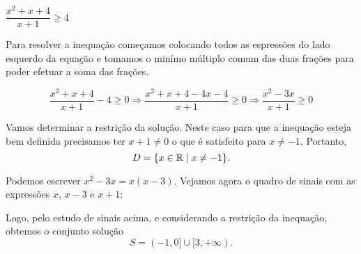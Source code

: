 \begin{exem}
  $\dfrac{x^2+x+4}{x+1} \geq 4$

  Para resolver a inequação começamos colocando todos as espressões do lado esquerdo da equação e tomamos o minímo múltiplo comum das duas frações para poder efetuar a soma das frações.

  \[\frac{x^2+x+4}{x+1} -4 \geq 0 \Rightarrow
    \frac{x^2+x+4-4x-4}{x+1} \geq 0 \Rightarrow
    \frac{x^2 - 3x}{x+1} \geq 0
  \]
  
  Vamos determinar a restrição da solução. Neste caso para que a inequação esteja bem definida precisamos ter $x+1 \neq 0$ o que é satisfeito para $x \neq -1$. Portanto,
  \[D= \{x \in \mathbb{R} \mid x \neq -1\}.\]
  

  Podemos escrever $x^2 - 3x=x(x-3)$. %
Vejamos agora o quadro de sinais com as expressões $x$, $x-3$ e $x+1$:
\begin{signtbl}{4}{3}
\end{signtbl}


 Logo, pelo estudo de sinais acima, e considerando a restrição da inequação, obtemos o conjunto solução
\begin{equation*}
S= (-1, 0] \cup [3, +\infty).
\end{equation*}
 \end{exem}



